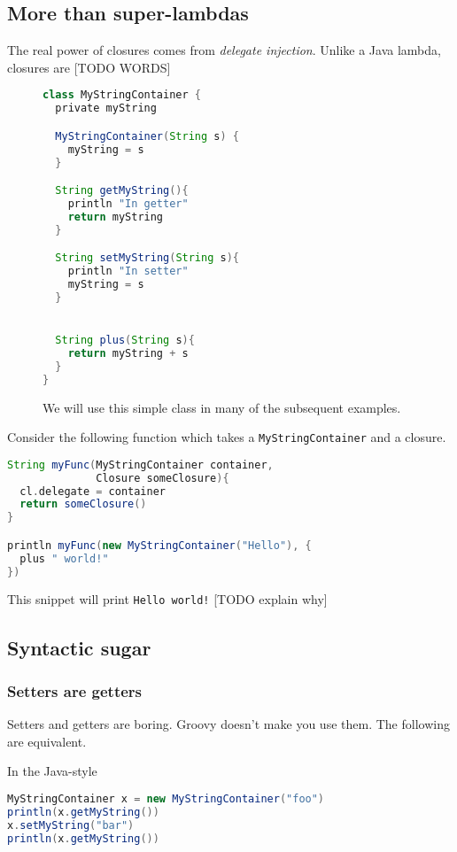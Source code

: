 \documentclass[]{article}
\theoremstyle{definition}
\begin{document}
\subsection{More than super-lambdas}
\label{sec:super-lambdas}
The real power of closures comes from \emph{delegate injection}.
Unlike a Java lambda, closures are [TODO WORDS]

\begin{figure}
  \centering
  \begin{lstlisting}[language=Groovy]
class MyStringContainer {
  private myString

  MyStringContainer(String s) {
    myString = s
  }

  String getMyString(){
    println "In getter"
    return myString
  }

  String setMyString(String s){
    println "In setter"
    myString = s
  }


  String plus(String s){
    return myString + s
  }
}
  \end{lstlisting}
  \caption{We will use this simple class in many of the subsequent examples.}
  \label{fig:container}
\end{figure}


Consider the following function which takes a \texttt{MyStringContainer} and a closure.

\begin{lstlisting}[language=Groovy]
String myFunc(MyStringContainer container,
              Closure someClosure){
  cl.delegate = container
  return someClosure()
}

println myFunc(new MyStringContainer("Hello"), {
  plus " world!"
})
\end{lstlisting}

This snippet will print \texttt{Hello world!}  [TODO explain why]

\subsection{Syntactic sugar}
\subsubsection{Setters are getters}

Setters and getters are boring.
Groovy doesn't make you use them.
The following are equivalent.

In the Java-style
\begin{lstlisting}[language=Groovy]
MyStringContainer x = new MyStringContainer("foo")
println(x.getMyString())
x.setMyString("bar")
println(x.getMyString())
\end{lstlisting}
\end{document}
